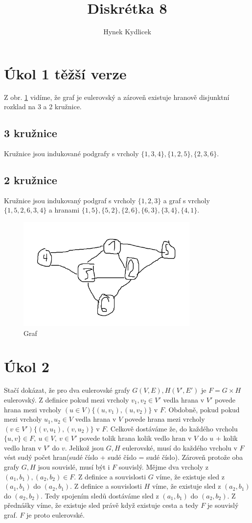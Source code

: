 \documentclass[a4paper]{article}
\author{Hynek Kydlicek}
\title{Diskrétka 8}
\begin{document}
\maketitle
\section{Úkol 1 těžší verze}%
Z obr. \ref{fig:graf} vidíme, že graf je eulerovský a zároveň existuje hranově disjunktní rozklad na 3 a 2 kružnice.
\\
\subsection{3 kružnice}%
Kružnice jsou indukované podgrafy s vrcholy $\{1, 3, 4\}, \{1, 2, 5\}, \{2, 3, 6\}$.
\subsection{2 kružnice}%
Kružnice jsou indukovaný podgraf s vrcholy $\{1, 2, 3\}$ a graf s vrcholy $\{1, 5, 2, 6, 3, 4\}$ a hranami $\{1,5\}, \{5, 2\}, \{2, 6\}, \{6,3\}, \{3,4\}, \{4,1\}$.
\begin{figure}[htpb]
    \centering
    \includegraphics[width=0.8\textwidth]{graf.png}
    \caption{Graf}
    \label{fig:graf}
\end{figure}

\section{Úkol 2}
Stačí dokázat, že pro dva eulerovské grafy $G(V, E), H(V', E')$  je \mbox{$F= G \times H$} eulerovský.
Z definice pokud mezi vrcholy $v_1, v_2 \in V'$ vedla hrana v $V'$ povede hrana mezi vrcholy $(u \in V) \{(u, v_1), (u, v_2)\}$ v $F$.
Obdobně, pokud pokud mezi vrcholy $u_1, u_2 \in V$ vedla hrana v $V$ povede hrana mezi vrcholy $(v \in V') \{(v, u_1), (v, u_2)\}$ v $F$.
Celkově dostáváme že, do každého vrcholu $\{u, v\} \in F,\ u \in V,\  v \in V' $ povede tolik hrana kolik vedlo hran v $V$ do $u$ + kolik vedlo hran v $V'$ do $v$.
Jelikož jsou $G,H$ eulerovské, musí do každého vrcholu v $F$ vést sudý počet hran(sudé číslo + sudé číslo = sudé číslo).
Zároveň protože oba grafy $G,H$ jsou souvislé, musí být i $F$ souvislý. Mějme dva vrcholy z $(a_1, b_1), (a_2, b_2) \in F$.
Z definice a souvislosti $G$ víme, že existuje sled z $(a_1, b_1)$ do $(a_2, b_1)$.
Z definice a souvislosti $H$ víme, že existuje sled z $(a_2, b_1)$ do $(a_2, b_2)$.
Tedy spojením sledů dostáváme sled z $(a_1, b_1)$ do $(a_2, b_2)$.
Z přednášky víme, že existuje sled právě když existuje cesta a tedy $F$ je souvislý graf.
$F$ je proto eulerovské.
\end{document}
